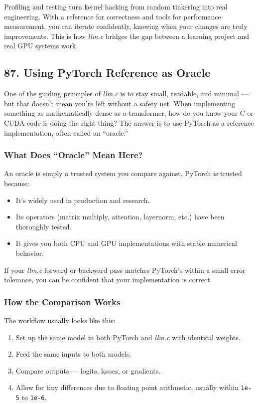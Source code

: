 \documentclass[
  letterpaper,
  DIV=11,
  numbers=noendperiod]{scrreprt}
\providecommand{\tightlist}{%
  \setlength{\itemsep}{0pt}\setlength{\parskip}{0pt}}
\begin{document}
Profiling and testing turn kernel hacking from random tinkering into
real engineering. With a reference for correctness and tools for
performance measurement, you can iterate confidently, knowing when your
changes are truly improvements. This is how \emph{llm.c} bridges the gap
between a learning project and real GPU systems work.

\subsection{87. Using PyTorch Reference as
Oracle}\label{using-pytorch-reference-as-oracle}

One of the guiding principles of \emph{llm.c} is to stay small,
readable, and minimal --- but that doesn't mean you're left without a
safety net. When implementing something as mathematically dense as a
transformer, how do you know your C or CUDA code is doing the right
thing? The answer is to use PyTorch as a reference implementation, often
called an ``oracle.''

\subsubsection{What Does ``Oracle'' Mean
Here?}\label{what-does-oracle-mean-here}

An oracle is simply a trusted system you compare against. PyTorch is
trusted because:

\begin{itemize}
\tightlist
\item
  It's widely used in production and research.
\item
  Its operators (matrix multiply, attention, layernorm, etc.) have been
  thoroughly tested.
\item
  It gives you both CPU and GPU implementations with stable numerical
  behavior.
\end{itemize}

If your \emph{llm.c} forward or backward pass matches PyTorch's within a
small error tolerance, you can be confident that your implementation is
correct.

\subsubsection{How the Comparison Works}\label{how-the-comparison-works}

The workflow usually looks like this:

\begin{enumerate}
\def\labelenumi{\arabic{enumi}.}
\tightlist
\item
  Set up the same model in both PyTorch and \emph{llm.c} with identical
  weights.
\item
  Feed the same inputs to both models.
\item
  Compare outputs --- logits, losses, or gradients.
\item
  Allow for tiny differences due to floating point arithmetic, usually
  within \texttt{1e-5} to \texttt{1e-6}.
\end{enumerate}
\end{document}
